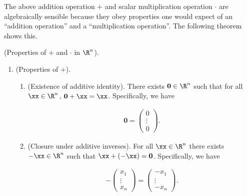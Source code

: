 The above addition operation $+$ and scalar multiplication operation $\cdot$ are algebraically sensible because they obey properties one would expect of an ``addition operation'' and a ``multiplication operation''. The following theorem shows this.

\newpage

\begin{theorem}
\label{ch::lin_alg::thm::prop_operations_Rn}
    (Properties of $+$ and $\cdot$ in $\R^n$).
        \begin{enumerate}
            \item (Properties of $+$).
            \begin{enumerate}
                \item[1.1.] (Existence of additive identity). There exists $\mathbf{0} \in \R^n$ such that for all $\xx \in \R^n$, $\mathbf{0} + \xx = \xx$. Specifically, we have
        
                \begin{align*}
                    \mathbf{0} = \begin{pmatrix} 0 \\ \vdots \\ 0 \end{pmatrix}.
                \end{align*}
                
                \item[1.2.] (Closure under additive inverses). For all $\xx \in \R^n$ there exists $-\xx \in \R^n$ such that $\xx + (-\xx) = \mathbf{0}$. Specifically, we have
        
                \begin{align*}
                    -\begin{pmatrix}
                        x_1 \\ \vdots \\ x_n
                    \end{pmatrix}
                    =
                    \begin{pmatrix}
                        -x_1 \\ \vdots \\ -x_n
                    \end{pmatrix}.
                \end{align*}
        

\end{enumerate}
\end{enumerate}
\end{theorem}
